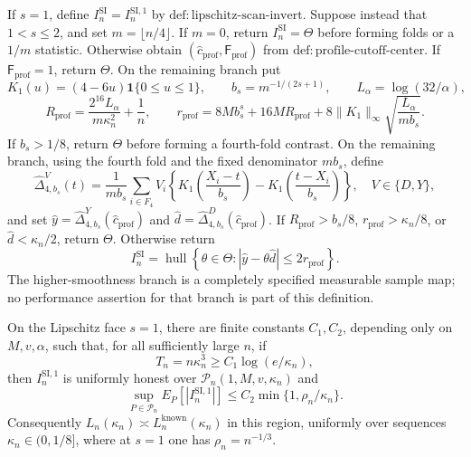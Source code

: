 If \(s=1\), define \(I_n^{\mathrm{SI}}=I_n^{\mathrm{SI},1}\) by
\(\mathrm{def:lipschitz\mbox{-}scan\mbox{-}invert}\).  Suppose instead
that \(1<s\le2\), and set \(m=\lfloor n/4\rfloor\).  If \(m=0\),
return \(I_n^{\mathrm{SI}}=\Theta\) before forming folds or a
\(1/m\) statistic.  Otherwise obtain
\((\widehat c_{\mathrm{prof}},\mathsf F_{\mathrm{prof}})\) from
\(\mathrm{def:profile\mbox{-}cutoff\mbox{-}center}\).  If
\(\mathsf F_{\mathrm{prof}}=1\), return \(\Theta\).  On the remaining
branch put
\[
 K_1(u)=(4-6u)\mathbf 1\{0\le u\le1\},\qquad
 b_s=m^{-1/(2s+1)},\qquad L_\alpha=\log(32/\alpha),
\]
\[
 R_{\mathrm{prof}}
 =\frac{2^{16}L_\alpha}{m\kappa_n^2}+\frac1n,
 \qquad
 r_{\mathrm{prof}}
 =8Mb_s^s+16MR_{\mathrm{prof}}
  +8\|K_1\|_\infty
     \sqrt{\frac{L_\alpha}{mb_s}}.
\]
If \(b_s>1/8\), return \(\Theta\) before forming a fourth-fold
contrast.  On the remaining branch, using the fourth fold and the
fixed denominator \(mb_s\), define
\[
 \widehat\Delta_{4,b_s}^{V}(t)
 =\frac1{mb_s}\sum_{i\in F_4}V_i
 \left\{K_1\!\left(\frac{X_i-t}{b_s}\right)
       -K_1\!\left(\frac{t-X_i}{b_s}\right)\right\},
 \quad V\in\{D,Y\},
\]
and set \(\widehat y=\widehat\Delta_{4,b_s}^{Y}
(\widehat c_{\mathrm{prof}})\) and
\(\widehat d=\widehat\Delta_{4,b_s}^{D}
(\widehat c_{\mathrm{prof}})\).  If
\(R_{\mathrm{prof}}>b_s/8\), \(r_{\mathrm{prof}}>\kappa_n/8\), or
\(\widehat d<\kappa_n/2\), return \(\Theta\).  Otherwise return
\[
 I_n^{\mathrm{SI}}
 =\operatorname{hull}\left\{\theta\in\Theta:
 |\widehat y-\theta\widehat d|\le2r_{\mathrm{prof}}\right\}.
\]
The higher-smoothness branch is a completely specified measurable
sample map; no performance assertion for that branch is part of this
definition.

On the Lipschitz face \(s=1\), there are finite constants
\(C_1,C_2\), depending only on \(M,v,\alpha\), such that, for all
sufficiently large \(n\), if
\[
 T_n=n\kappa_n^3\ge C_1\log(e/\kappa_n),
\]
then \(I_n^{\mathrm{SI},1}\) is uniformly honest over
\(\mathcal P_n(1,M,v,\kappa_n)\) and
\[
 \sup_{P\in\mathcal P_n}E_P[|I_n^{\mathrm{SI},1}|]
 \le C_2\min\{1,\rho_n/\kappa_n\}.
\]
Consequently
\(L_n(\kappa_n)\asymp L_n^{\mathrm{known}}(\kappa_n)\) in this
region, uniformly over sequences \(\kappa_n\in(0,1/8]\), where at
\(s=1\) one has \(\rho_n=n^{-1/3}\).


